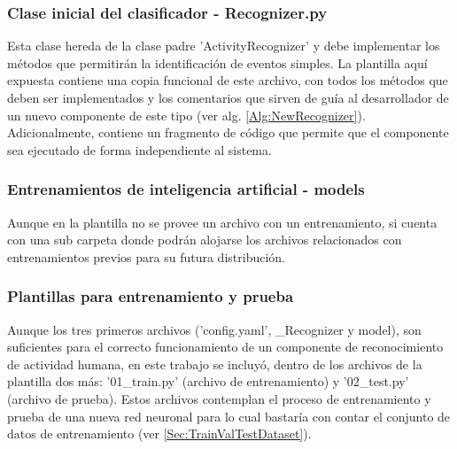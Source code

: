         \subsubsection{Clase inicial del clasificador - Recognizer.py}
        \label{sub2:classFileHAR}
            Esta clase hereda de la clase padre 'ActivityRecognizer' y debe implementar los métodos que permitirán la identificación de eventos simples. La plantilla aquí expuesta contiene una copia funcional de este archivo, con todos los métodos que deben ser implementados y los comentarios que sirven de guía al desarrollador de un nuevo componente de este tipo (ver alg. \ref{Alg:NewRecognizer}). Adicionalmente, contiene un fragmento de código que permite que el componente sea ejecutado de forma independiente al sistema.
            
            

        \subsubsection{Entrenamientos de inteligencia artificial - models}
        \label{sub2:modelFileHAR}
            Aunque en la plantilla no se provee un archivo con un entrenamiento, si cuenta con una sub carpeta donde podrán alojarse los archivos relacionados con entrenamientos previos para su futura distribución.
        
        \subsubsection{Plantillas para entrenamiento y prueba}
        \label{sub2:trainFileHAR}
            Aunque los tres primeros archivos ('config.yaml', \_Recognizer y model), son suficientes para el correcto funcionamiento de un componente de reconocimiento de actividad humana, en este trabajo se incluyó, dentro de los archivos de la plantilla dos más: '01\_train.py' (archivo de entrenamiento) y '02\_test.py' (archivo de prueba). Estos archivos contemplan el proceso de entrenamiento y prueba de una nueva red neuronal para lo cual bastaría con contar el conjunto de datos de entrenamiento (ver \ref{Sec:TrainValTestDataset}).
            

